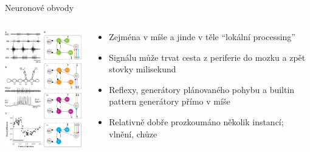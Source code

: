 \documentclass{beamer}
\begin{document}
\subsection{}
\begin{frame}{Neuronové obvody}
\begin{columns}
\begin{column}{5cm}
\includegraphics[width=5cm]{fnbeh-04-00045-g003.jpg}
\end{column}
\begin{column}{6cm}
\begin{itemize}
\item Zejména v míše a jinde v těle ``lokální processing''
\item Signálu může trvat cesta z periferie do mozku a zpět stovky milisekund
\item Reflexy, generátory plánovaného pohybu a builtin pattern generátory přímo v míše
\item Relativně dobře prozkoumáno několik instancí; vlnění, chůze
\end{itemize}
\end{column}
\end{columns}
\end{frame}
\end{document}
